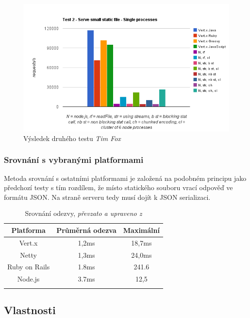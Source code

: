 \begin{figure}
\begin{centering}
\includegraphics[scale=0.7]{obrazky/chart_3-5}
\par\end{centering}
\caption{Výsledek druhého testu \emph{Tim Fox} \cite{benchmarkTim}\label{fig:test2}}
\end{figure}

\subsubsection{Srovnání s vybranými platformami}

Metoda srovnání s ostatními platformami je založená na podobném principu jako předchozí testy s tím rozdílem, že místo statického souboru vrací odpověď ve formátu JSON. Na straně serveru tedy musí dojít k JSON serializaci.

\begin{flushleft}
\begin{longtable}{|c|c|c|}
\hline
\textsf{\textbf{Platforma}} & \textsf{\textbf{Průměrná odezva}} & \textsf{\textbf{Maximální}}\tabularnewline
\hline
Vert.x & 1,2ms & 18,7ms\tabularnewline
\hline 
Netty & 1,3ms & 24,0ms\tabularnewline
\hline
Ruby on Rails & 1.8ms & 241.6\tabularnewline
\hline 
Node.js & 3.7ms & 12,5\tabularnewline
\hline 

\caption{Srovnání odezvy, \emph{převzato a upraveno z} \cite{benchmark}}
\label{table:odezvy}
\end{longtable}
\end{flushleft}

\subsection{Vlastnosti}

